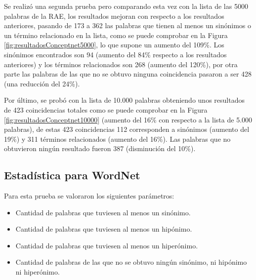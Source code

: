 Se realizó una segunda prueba pero comparando esta vez con la lista de las 5000 palabras de la RAE, los resultados mejoran con respecto a los resultados anteriores, pasando de 173 a 362 las palabras que tienen al menos un sinónimos o un término relacionado en la lista, como se puede comprobar en la Figura \ref{fig:resultadosConceptnet5000}, lo que supone un aumento del 109\%. Los sinónimos encontrados son 94 (aumento del 84\% respecto a los resultados anteriores) y los términos relacionados son 268 (aumento del 120\%), por otra parte las palabras de las que no se obtuvo ninguna coincidencia pasaron a ser 428 (una reducción del 24\%).


Por último, se probó con la lista de 10.000 palabras obteniendo unos resultados de 423 coincidencias totales como se puede comprobar en la Figura \ref{fig:resultadosConceptnet10000} (aumento del 16\% con respecto a la lista de 5.000 palabras), de estas 423 coincidencias 112 corresponden a sinónimos (aumento del 19\%) y 311 términos relacionados (aumento del 16\%). Las palabras que no obtuvieron ningún resultado fueron 387 (disminución del 10\%).



\subsection{Estadística para WordNet}
\label{cap:subsec:pruebaWordnet}

Para esta prueba se valoraron los siguientes parámetros:
\begin{itemize}
	\item Cantidad de palabras que tuviesen al menos un sinónimo.
	\item Cantidad de palabras que tuviesen al menos un hipónimo.
	\item Cantidad de palabras que tuviesen al menos un hiperónimo.
	\item Cantidad de palabras de las que no se obtuvo ningún sinónimo, ni hipónimo ni hiperónimo.
\end{itemize}

